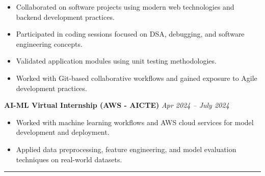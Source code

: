 \documentclass[a4paper,10pt]{article}
\newcommand{\sectionline}
{\vspace{-0.1em}\noindent\rule{\linewidth}{0.6pt}\vspace{-0.7em}}
\begin{document}
\begin{itemize}[leftmargin=1.5em,itemsep=0.05em]

\item Collaborated on software projects using modern web technologies and backend development practices.

\item Participated in coding sessions focused on DSA, debugging, and software engineering concepts.

\item Validated application modules using unit testing methodologies.

\item Worked with Git-based collaborative workflows and gained exposure to Agile development practices.

\end{itemize}
\textbf{AI-ML Virtual Internship (AWS - AICTE)}
\hfill
\textit{Apr 2024 -- July 2024}

\begin{itemize}[leftmargin=1.5em,itemsep=0.05em]

\item Worked with machine learning workflows and AWS cloud services for model development and deployment.

\item Applied data preprocessing, feature engineering, and model evaluation techniques on real-world datasets.

\end{itemize}


\sectionline
\end{document}
